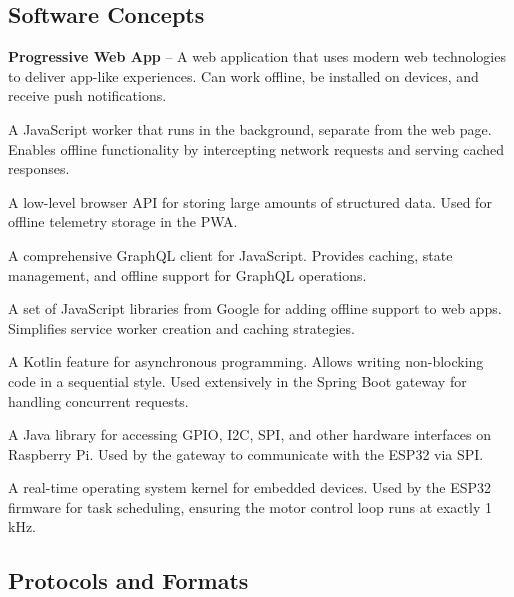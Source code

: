 \documentclass[11pt,letterpaper]{article}
\begin{document}
\subsection{Software Concepts}

\begin{description}[style=nextline, leftmargin=2cm]
    \item[PWA] \textbf{Progressive Web App} -- A web application that uses modern web technologies to deliver app-like experiences. Can work offline, be installed on devices, and receive push notifications.

    \item[Service Worker] A JavaScript worker that runs in the background, separate from the web page. Enables offline functionality by intercepting network requests and serving cached responses.

    \item[IndexedDB] A low-level browser API for storing large amounts of structured data. Used for offline telemetry storage in the PWA.

    \item[Apollo Client] A comprehensive GraphQL client for JavaScript. Provides caching, state management, and offline support for GraphQL operations.

    \item[Workbox] A set of JavaScript libraries from Google for adding offline support to web apps. Simplifies service worker creation and caching strategies.

    \item[Coroutines] A Kotlin feature for asynchronous programming. Allows writing non-blocking code in a sequential style. Used extensively in the Spring Boot gateway for handling concurrent requests.

    \item[Pi4J] A Java library for accessing GPIO, I2C, SPI, and other hardware interfaces on Raspberry Pi. Used by the gateway to communicate with the ESP32 via SPI.

    \item[FreeRTOS] A real-time operating system kernel for embedded devices. Used by the ESP32 firmware for task scheduling, ensuring the motor control loop runs at exactly 1 kHz.
\end{description}

\subsection{Protocols and Formats}
\end{document}
